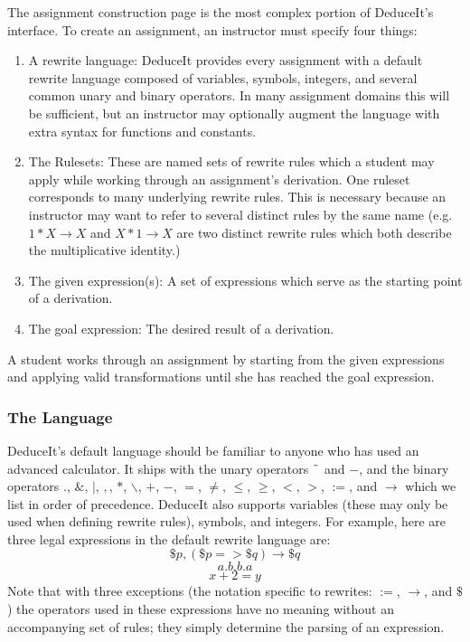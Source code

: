 \documentclass{sigchi}
\begin{document}
The assignment construction page is the most complex portion of DeduceIt's interface. To create an assignment, an instructor must specify four things: 
  \begin{enumerate}
  \item A rewrite language: DeduceIt provides every assignment with a default rewrite language composed of variables, symbols, integers, and several common unary and binary operators. In many assignment domains this will be sufficient, but an instructor may optionally augment the language with extra syntax for functions and constants. 
  \item The Rulesets: These are named sets of rewrite rules which a student may apply while working through an assignment's derivation. One ruleset corresponds to many underlying rewrite rules. This is necessary because an instructor may want to refer to several distinct rules by the same name (e.g. $1*X \rightarrow X$ and $X*1 \rightarrow X$ are two distinct rewrite rules which both describe the multiplicative identity.)
  \item The given expression(s): A set of expressions which serve as the starting point of a derivation.
  \item The goal expression: The desired result of a derivation.
  \end{enumerate}

A student works through an assignment by starting from the given expressions and applying valid transformations until she has reached the goal expression.

\subsubsection{The Language}

DeduceIt's default language should be familiar to anyone who has used an advanced calculator. It ships with the unary operators $\char`\~$ and $-$, and the binary operators $.$, $\&$, $|$, $,$, $*$, $\backslash$, $+$, $-$, $=$, $\neq$, $\leq$, $\geq$, $<$, $>$, $:=$, and $\rightarrow$ which we list in order of precedence. DeduceIt also supports variables (these may only be used when defining rewrite rules), symbols, and integers. For example, here are three legal expressions in the default rewrite language are: 
$$\$p,(\$p=>\$q)\rightarrow{}\$q$$ 
$$a.b.b.a$$
$$x+2=y$$ 
Note that with three exceptions (the notation specific to rewrites: $:=$, $\rightarrow$, and $\$$) the operators used in these expressions have no meaning without an accompanying set of rules; they simply determine the parsing of an expression.
\end{document}
